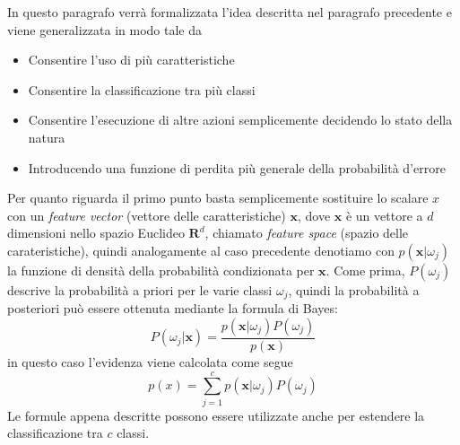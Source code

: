In questo paragrafo verrà formalizzata l'idea descritta nel paragrafo precedente e viene generalizzata in modo tale da 
\begin{itemize}
\item Consentire l'uso di più caratteristiche
\item Consentire la classificazione tra più classi
\item Consentire l'esecuzione di altre azioni semplicemente decidendo lo stato della natura
\item Introducendo una funzione di perdita più generale della probabilità d'errore
\end{itemize}
Per quanto riguarda il primo punto basta semplicemente sostituire lo scalare $x$ con un \emph{feature vector} (vettore delle caratteristiche) $\mathbf{x}$, dove $\mathbf{x}$ è un vettore a $d$ dimensioni nello spazio Euclideo 	$\mathbf{R}^d$, chiamato \emph{feature space} (spazio delle carateristiche), quindi analogamente al caso precedente denotiamo con $p(\mathbf{x}|\omega_j)$ la funzione di densità della probabilità condizionata per $\mathbf{x}$. Come prima, $P(\omega_j)$ descrive la probabilità a priori per le varie classi $\omega_j$, quindi la probabilità a posteriori può essere ottenuta mediante la formula di Bayes:
\begin{equation}
P(\omega_j| \mathbf{x}) = \frac{p(\mathbf{x}|\omega_j) P(\omega_j)}{p(\mathbf{x})}
\end{equation}
in questo caso l'evidenza viene calcolata come segue
\begin{equation}
p(x) = \sum_{j=1}^c p(\mathbf{x} | \omega_j) P(\omega_j)
\end{equation}
Le formule appena descritte possono essere utilizzate anche per estendere la classificazione tra $c$ classi.\\

